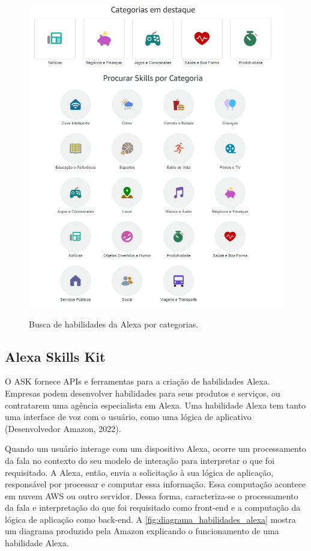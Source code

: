 \begin{figure}[htbp]
	\centering
	\caption{Busca de habilidades da Alexa por categorias.}
	\includegraphics[scale=0.8]{Imagens/alexa_skills_categorias.png}
	\label{fig:alexa_skills_categorias}
\end{figure}

\subsection{Alexa Skills Kit}\label{subsection:alexa_skills_kit}
O ASK fornece APIs e ferramentas para a criação de habilidades Alexa. Empresas podem desenvolver habilidades para seus produtos e serviços, ou contratarem uma agência especialista em Alexa. Uma habilidade Alexa tem tanto uma interface de voz com o usuário, como uma lógica de aplicativo (Desenvolvedor Amazon, 2022).

Quando um usuário interage com um dispositivo Alexa, ocorre um processamento da fala no contexto do seu modelo de interação para interpretar o que foi requisitado. A Alexa, então, envia a solicitação à sua lógica de aplicação, responsável por processar e computar essa informação. Essa computação acontece em nuvem AWS ou outro servidor. Dessa forma, caracteriza-se o processamento da fala e interpretação do que foi requisitado como front-end e a computação da lógica de aplicação como back-end. A \autoref{fig:diagrama_habilidades_alexa} mostra um diagrama produzido pela Amazon explicando o funcionamento de uma habilidade Alexa.

